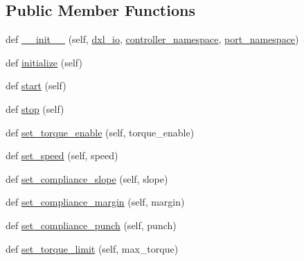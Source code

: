 \subsection*{Public Member Functions}
\begin{DoxyCompactItemize}
\item 
def \hyperlink{classdynamixel__controllers_1_1joint__controller_1_1_joint_controller_ab17ccdf8f2f415bed15925ce6f798935}{\+\_\+\+\_\+init\+\_\+\+\_\+} (self, \hyperlink{classdynamixel__controllers_1_1joint__controller_1_1_joint_controller_a8be2fb1ed88aee6590c938122361c780}{dxl\+\_\+io}, \hyperlink{classdynamixel__controllers_1_1joint__controller_1_1_joint_controller_a8b34f86e463a0ce3fcf52a09b6ea7dc2}{controller\+\_\+namespace}, \hyperlink{classdynamixel__controllers_1_1joint__controller_1_1_joint_controller_ac89de71afa48761fb662ac2917a5b9d3}{port\+\_\+namespace})
\item 
def \hyperlink{classdynamixel__controllers_1_1joint__controller_1_1_joint_controller_afb48c76aacd3a1cf49b7e3e412760976}{initialize} (self)
\item 
def \hyperlink{classdynamixel__controllers_1_1joint__controller_1_1_joint_controller_a8da16a8b801f868a4de7c68d6adc851f}{start} (self)
\item 
def \hyperlink{classdynamixel__controllers_1_1joint__controller_1_1_joint_controller_a978da6ac850b0dd6a67ebe4a23f8fcdc}{stop} (self)
\item 
def \hyperlink{classdynamixel__controllers_1_1joint__controller_1_1_joint_controller_ad65f926abe6c4dec19d0a4dbd05d21d9}{set\+\_\+torque\+\_\+enable} (self, torque\+\_\+enable)
\item 
def \hyperlink{classdynamixel__controllers_1_1joint__controller_1_1_joint_controller_ae33e128897d20f659427e69e7f791a88}{set\+\_\+speed} (self, speed)
\item 
def \hyperlink{classdynamixel__controllers_1_1joint__controller_1_1_joint_controller_a72508504f90f51b689d256d0dd3fc87b}{set\+\_\+compliance\+\_\+slope} (self, slope)
\item 
def \hyperlink{classdynamixel__controllers_1_1joint__controller_1_1_joint_controller_ac05dc0cc7cfeade108bec65b5937c172}{set\+\_\+compliance\+\_\+margin} (self, margin)
\item 
def \hyperlink{classdynamixel__controllers_1_1joint__controller_1_1_joint_controller_a3d62f11f16ce860e39dfbfaa2b598a5b}{set\+\_\+compliance\+\_\+punch} (self, punch)
\item 
def \hyperlink{classdynamixel__controllers_1_1joint__controller_1_1_joint_controller_a653d0406d8655dc9d75f12e1a523ba89}{set\+\_\+torque\+\_\+limit} (self, max\+\_\+torque)

\end{DoxyCompactItemize}
